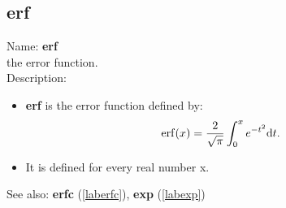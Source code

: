 \subsection{erf}
\label{laberf}
\noindent Name: \textbf{erf}\\
the error function.\\

\noindent Description: \begin{itemize}

\item \textbf{erf} is the error function defined by:
   $$\mathrm{erf}(x) = \frac{2}{\sqrt{\pi}} \int_0^x e^{-t^2} {\rm d}t.$$

\item It is defined for every real number x.
\end{itemize}
See also: \textbf{erfc} (\ref{laberfc}), \textbf{exp} (\ref{labexp})

